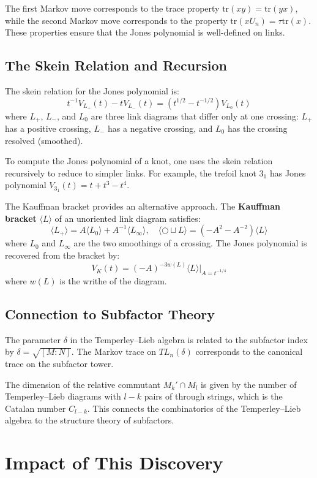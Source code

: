 The first Markov move corresponds to the trace property $\text{tr}(xy) = \text{tr}(yx)$, while the second Markov move corresponds to the property $\text{tr}(xU_n) = \tau \text{tr}(x)$. These properties ensure that the Jones polynomial is well-defined on links.

\subsection*{The Skein Relation and Recursion}

The skein relation for the Jones polynomial is:
\[
t^{-1} V_{L_+}(t) - t V_{L_-}(t) = (t^{1/2} - t^{-1/2}) V_{L_0}(t)
\]
where $L_+$, $L_-$, and $L_0$ are three link diagrams that differ only at one crossing: $L_+$ has a positive crossing, $L_-$ has a negative crossing, and $L_0$ has the crossing resolved (smoothed).

To compute the Jones polynomial of a knot, one uses the skein relation recursively to reduce to simpler links. For example, the trefoil knot $3_1$ has Jones polynomial $V_{3_1}(t) = t + t^3 - t^4$.

The Kauffman bracket provides an alternative approach. The \textbf{Kauffman bracket} $\langle L \rangle$ of an unoriented link diagram satisfies:
\[
\langle L_+ \rangle = A \langle L_0 \rangle + A^{-1} \langle L_\infty \rangle, \quad \langle \bigcirc \sqcup L \rangle = (-A^2 - A^{-2}) \langle L \rangle
\]
where $L_0$ and $L_\infty$ are the two smoothings of a crossing. The Jones polynomial is recovered from the bracket by:
\[
V_K(t) = (-A)^{-3w(L)} \langle L \rangle \big|_{A = t^{-1/4}}
\]
where $w(L)$ is the writhe of the diagram.

\subsection*{Connection to Subfactor Theory}

The parameter $\delta$ in the Temperley--Lieb algebra is related to the subfactor index by $\delta = \sqrt{[M:N]}$. The Markov trace on $TL_n(\delta)$ corresponds to the canonical trace on the subfactor tower.

The dimension of the relative commutant $M_k' \cap M_l$ is given by the number of Temperley--Lieb diagrams with $l-k$ pairs of through strings, which is the Catalan number $C_{l-k}$. This connects the combinatorics of the Temperley--Lieb algebra to the structure theory of subfactors.

\section{Impact of This Discovery}

